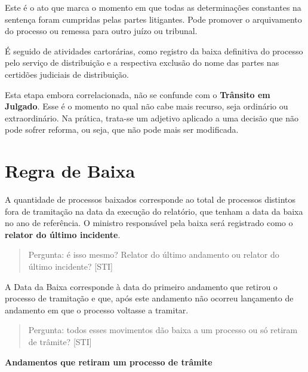 \documentclass[
]{book}
\begin{document}
Este é o ato que marca o momento em que todas as determinações constantes na sentença foram cumpridas pelas partes litigantes. Pode promover o arquivamento do processo ou remessa para outro juízo ou tribunal.

É seguido de atividades cartorárias, como registro da baixa definitiva do processo pelo serviço de distribuição e a respectiva exclusão do nome das partes nas certidões judiciais de distribuição.

Esta etapa embora correlacionada, não se confunde com o \textbf{Trânsito em Julgado}. Esse é o momento no qual não cabe mais recurso, seja ordinário ou extraordinário. Na prática, trata-se um adjetivo aplicado a uma decisão que não pode sofrer reforma, ou seja, que não pode mais ser modificada.

\hypertarget{regra-de-baixa}{%
\section{Regra de Baixa}\label{regra-de-baixa}}

A quantidade de processos baixados corresponde ao total de processos distintos fora de tramitação na data da execução do relatório, que tenham a data da baixa no ano de referência. O ministro responsável pela baixa será registrado como o \textbf{relator do último incidente}.

\begin{quote}
Pergunta: é isso mesmo? Relator do último andamento ou relator do último incidente? {[}STI{]}
\end{quote}

A Data da Baixa corresponde à data do primeiro andamento que retirou o processo de tramitação e que, após este andamento não ocorreu lançamento de andamento em que o processo voltasse a tramitar.

\begin{quote}
Pergunta: todos esses movimentos dão baixa a um processo ou só retiram de trâmite? {[}STI{]}
\end{quote}

\textbf{Andamentos que retiram um processo de trâmite}
\end{document}
